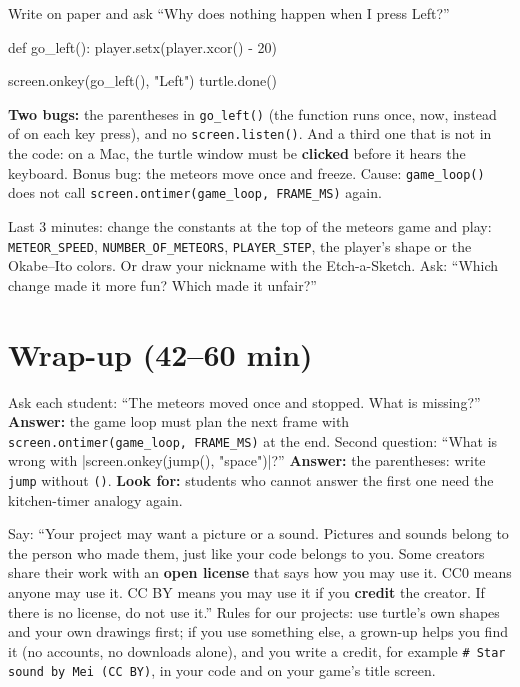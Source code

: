 \begin{bughunt}
Write on paper and ask \enquote{Why does nothing happen when I press Left?}
\begin{pycode}
def go_left():
    player.setx(player.xcor() - 20)

screen.onkey(go_left(), "Left")
turtle.done()
\end{pycode}
\textbf{Two bugs:} the parentheses in \texttt{go\_left()} (the function runs once, now, instead of on each key press), and no \texttt{screen.listen()}.
And a third one that is not in the code: on a Mac, the turtle window must be \textbf{clicked} before it hears the keyboard.
Bonus bug: the meteors move once and freeze. Cause: \texttt{game\_loop()} does not call \texttt{screen.ontimer(game\_loop, FRAME\_MS)} again.
\end{bughunt}

\begin{freebuild}
Last 3 minutes: change the constants at the top of the meteors game and play: \texttt{METEOR\_SPEED}, \texttt{NUMBER\_OF\_METEORS}, \texttt{PLAYER\_STEP},
the player's shape or the Okabe--Ito colors. Or draw your nickname with the Etch-a-Sketch. Ask: \enquote{Which change made it more fun? Which made it unfair?}
\end{freebuild}

\section{Wrap-up (42--60 min)}
\begin{formativecheck}
Ask each student: \enquote{The meteors moved once and stopped. What is missing?} \textbf{Answer:} the game loop must plan the next frame with
\texttt{screen.ontimer(game\_loop, FRAME\_MS)} at the end. Second question: \enquote{What is wrong with \py|screen.onkey(jump(), "space")|?}
\textbf{Answer:} the parentheses: write \texttt{jump} without \texttt{()}. \textbf{Look for:} students who cannot answer the first one need the kitchen-timer analogy again.
\end{formativecheck}

\begin{safety}
Say: \enquote{Your project may want a picture or a sound. Pictures and sounds belong to the person who made them, just like your code belongs to you.
Some creators share their work with an \textbf{open license} that says how you may use it. CC0 means anyone may use it. CC BY means you may use it if you
\textbf{credit} the creator. If there is no license, do not use it.} Rules for our projects: use turtle's own shapes and your own drawings first; if you
use something else, a grown-up helps you find it (no accounts, no downloads alone), and you write a credit, for example
\texttt{\# Star sound by Mei (CC BY)}, in your code and on your game's title screen.
\end{safety}

